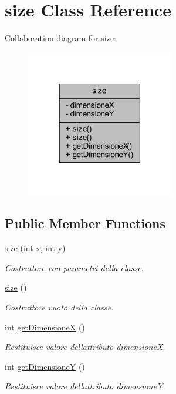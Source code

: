 \hypertarget{class_snake_1_1gui_1_1size}{}\section{size Class Reference}
\label{class_snake_1_1gui_1_1size}


Collaboration diagram for size\+:
\nopagebreak
\begin{figure}[H]
\begin{center}
\leavevmode
\includegraphics[width=183pt]{class_snake_1_1gui_1_1size__coll__graph}
\end{center}
\end{figure}
\subsection*{Public Member Functions}
\begin{DoxyCompactItemize}
\item 
\mbox{\hyperlink{class_snake_1_1gui_1_1size_a7c4658f39544b40f6effd803b0751dec}{size}} (int x, int y)
\begin{DoxyCompactList}\small\item\em Costruttore con parametri della classe. \end{DoxyCompactList}\item 
\mbox{\hyperlink{class_snake_1_1gui_1_1size_a775bfb88c1bb7975d67f277eade2a1b7}{size}} ()
\begin{DoxyCompactList}\small\item\em Costruttore vuoto della classe. \end{DoxyCompactList}\item 
int \mbox{\hyperlink{class_snake_1_1gui_1_1size_a9e8362afc9e8ce68cca6528eb57869a2}{get\+DimensioneX}} ()
\begin{DoxyCompactList}\small\item\em Restituisce valore dell\textquotesingle{}attributo dimensioneX. \end{DoxyCompactList}\item 
int \mbox{\hyperlink{class_snake_1_1gui_1_1size_a2bb8f24fa464bafa5b480a95b8b738a8}{get\+DimensioneY}} ()
\begin{DoxyCompactList}\small\item\em Restituisce valore dell\textquotesingle{}attributo dimensioneY. \end{DoxyCompactList}\end{DoxyCompactItemize}
